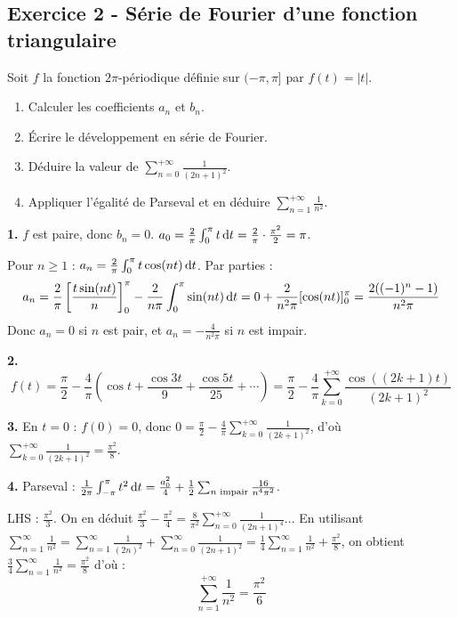 \documentclass[12pt,a4paper]{article}
\begin{document}
\subsection*{Exercice 2 - Série de Fourier d'une fonction triangulaire \niveau{\moyen}}

\begin{boiteexercice}
Soit $f$ la fonction $2\pi$-périodique définie sur $(-\pi,\pi]$ par $f(t) = |t|$.
\begin{enumerate}
  \item Calculer les coefficients $a_n$ et $b_n$.
  \item Écrire le développement en série de Fourier.
  \item Déduire la valeur de $\sum_{n=0}^{+\infty}\frac{1}{(2n+1)^2}$.
  \item Appliquer l'égalité de Parseval et en déduire $\sum_{n=1}^{+\infty}\frac{1}{n^2}$.
\end{enumerate}
\end{boiteexercice}

\begin{boitecorrige}
\textbf{1.} $f$ est paire, donc $b_n=0$. $a_0 = \frac{2}{\pi}\int_0^\pi t\,\mathrm{d} t = \frac{2}{\pi}\cdot\frac{\pi^2}{2} = \pi$.

Pour $n\geq1$ : $a_n = \frac{2}{\pi}\int_0^\pi t\cos(nt)\,\mathrm{d} t$. Par parties :
\[
a_n = \frac{2}{\pi}\left[\frac{t\sin(nt)}{n}\right]_0^\pi - \frac{2}{n\pi}\int_0^\pi\sin(nt)\,\mathrm{d} t = 0 + \frac{2}{n^2\pi}[\cos(nt)]_0^\pi = \frac{2((-1)^n-1)}{n^2\pi}
\]
Donc $a_n=0$ si $n$ est pair, et $a_n = -\frac{4}{n^2\pi}$ si $n$ est impair.

\textbf{2.}
\[
f(t) = \frac{\pi}{2} - \frac{4}{\pi}\left(\cos t + \frac{\cos 3t}{9} + \frac{\cos 5t}{25}+\cdots\right) = \frac{\pi}{2} - \frac{4}{\pi}\sum_{k=0}^{+\infty}\frac{\cos((2k+1)t)}{(2k+1)^2}
\]

\textbf{3.} En $t=0$ : $f(0)=0$, donc $0 = \frac{\pi}{2} - \frac{4}{\pi}\sum_{k=0}^{+\infty}\frac{1}{(2k+1)^2}$, d'où $\displaystyle\sum_{k=0}^{+\infty}\frac{1}{(2k+1)^2} = \frac{\pi^2}{8}$.

\textbf{4.} Parseval : $\frac{1}{2\pi}\int_{-\pi}^\pi t^2\,\mathrm{d} t = \frac{a_0^2}{4}+\frac{1}{2}\sum_{n\text{ impair}}\frac{16}{n^4\pi^2}$.

LHS : $\frac{\pi^2}{3}$. On en déduit $\frac{\pi^2}{3} - \frac{\pi^2}{4} = \frac{8}{\pi^2}\sum_{n=0}^{+\infty}\frac{1}{(2n+1)^4}$... En utilisant $\sum_{n=1}^\infty\frac{1}{n^2} = \sum_{n=1}^\infty\frac{1}{(2n)^2}+\sum_{n=0}^\infty\frac{1}{(2n+1)^2} = \frac{1}{4}\sum_{n=1}^\infty\frac{1}{n^2}+\frac{\pi^2}{8}$, on obtient $\frac{3}{4}\sum_{n=1}^\infty\frac{1}{n^2}=\frac{\pi^2}{8}$ d'où :
\[
\sum_{n=1}^{+\infty}\frac{1}{n^2} = \frac{\pi^2}{6}
\]
\end{boitecorrige}
\end{document}

